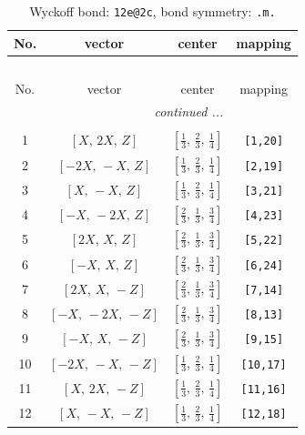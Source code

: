 \documentclass[fleqn,8pt]{jsarticle}
\begin{document}
\renewcommand{\arraystretch}{1.2}
\begin{longtable}{cccc}
\caption{Wyckoff bond: {\tt 12e@2c}, bond symmetry: {\tt .m.}}
 \\
 \hline \hline
No. & vector & center & mapping \\ \hline \endfirsthead

\multicolumn{3}{l}{\tablename\ \thetable{}} \\
 \hline \hline
No. & vector & center & mapping \\ \hline \endhead

 \hline \hline
\multicolumn{3}{r}{\footnotesize\it continued ...} \\ \endfoot

 \hline \hline
\multicolumn{3}{r}{} \\ \endlastfoot

1 & $\left[ X,\, 2 X,\, Z \right]$ & $\left[ \frac{1}{3},\, \frac{2}{3},\, \frac{1}{4} \right]$ & {\tt [1,20]} \\ \hline
2 & $\left[ - 2 X,\, - X,\, Z \right]$ & $\left[ \frac{1}{3},\, \frac{2}{3},\, \frac{1}{4} \right]$ & {\tt [2,19]} \\ \hline
3 & $\left[ X,\, - X,\, Z \right]$ & $\left[ \frac{1}{3},\, \frac{2}{3},\, \frac{1}{4} \right]$ & {\tt [3,21]} \\ \hline
4 & $\left[ - X,\, - 2 X,\, Z \right]$ & $\left[ \frac{2}{3},\, \frac{1}{3},\, \frac{3}{4} \right]$ & {\tt [4,23]} \\ \hline
5 & $\left[ 2 X,\, X,\, Z \right]$ & $\left[ \frac{2}{3},\, \frac{1}{3},\, \frac{3}{4} \right]$ & {\tt [5,22]} \\ \hline
6 & $\left[ - X,\, X,\, Z \right]$ & $\left[ \frac{2}{3},\, \frac{1}{3},\, \frac{3}{4} \right]$ & {\tt [6,24]} \\ \hline
7 & $\left[ 2 X,\, X,\, - Z \right]$ & $\left[ \frac{2}{3},\, \frac{1}{3},\, \frac{3}{4} \right]$ & {\tt [7,14]} \\ \hline
8 & $\left[ - X,\, - 2 X,\, - Z \right]$ & $\left[ \frac{2}{3},\, \frac{1}{3},\, \frac{3}{4} \right]$ & {\tt [8,13]} \\ \hline
9 & $\left[ - X,\, X,\, - Z \right]$ & $\left[ \frac{2}{3},\, \frac{1}{3},\, \frac{3}{4} \right]$ & {\tt [9,15]} \\ \hline
10 & $\left[ - 2 X,\, - X,\, - Z \right]$ & $\left[ \frac{1}{3},\, \frac{2}{3},\, \frac{1}{4} \right]$ & {\tt [10,17]} \\ \hline
11 & $\left[ X,\, 2 X,\, - Z \right]$ & $\left[ \frac{1}{3},\, \frac{2}{3},\, \frac{1}{4} \right]$ & {\tt [11,16]} \\ \hline
12 & $\left[ X,\, - X,\, - Z \right]$ & $\left[ \frac{1}{3},\, \frac{2}{3},\, \frac{1}{4} \right]$ & {\tt [12,18]} \\
\end{longtable}
\end{document}
